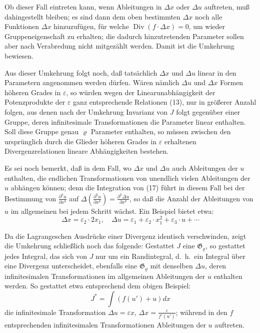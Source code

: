\documentclass[12pt,a4paper]{article}
\begin{document}
Ob dieser Fall eintreten kann, wenn Ableitungen in $\Delta x$ oder $\Delta u$ auftreten, mu\ss{} dahingestellt bleiben; es sind dann dem oben bestimmten $\Delta x$ noch alle Funktionen $\Delta x$ hinzuzuf\"ugen, f\"ur welche $\operatorname{Div}(f\cdot\Delta x)=0$, um wieder Gruppeneigenschaft zu erhalten; die dadurch hinzutretenden Parameter sollen aber nach Verabredung nicht mitgez\"ahlt werden. Damit ist die Umkehrung bewiesen.

Aus dieser Umkehrung folgt noch, da\ss{} tats\"achlich $\Delta x$ und $\Delta u$ linear in den Parametern angenommen werden d\"urfen. W\"aren n\"amlich $\Delta u$ und $\Delta x$ Formen h\"oheren Grades in $\varepsilon$, so w\"urden wegen der Linearunabh\"angigkeit der Potenzprodukte der $\varepsilon$ ganz entsprechende Relationen (13), nur in gr\"o\ss{}erer Anzahl folgen, aus denen nach der Umkehrung Invarianz von $J$ folgt gegen\"uber einer Gruppe, deren infinitesimale Transformationen die Parameter linear enthalten. Soll diese Gruppe genau $\varrho$ Parameter enthalten, so m\"ussen zwischen den urspr\"unglich durch die Glieder h\"oheren Grades in $\varepsilon$ erhaltenen Divergenzrelationen lineare Abh\"angigkeiten bestehen.

Es sei noch bemerkt, da\ss{} in dem Fall, wo $\Delta x$ und $\Delta u$ auch Ableitungen der $u$ enthalten, die endlichen Transformationen von unendlich vielen Ableitungen der $u$ abh\"angen k\"onnen; denn die Integration von (17) f\"uhrt in diesem Fall bei der Bestimmung von $\frac{\partial^{k}u}{\partial x^{k}}$ auf $\Delta\left(\frac{\partial^{k}u}{\partial x^{k}}\right)=\frac{\partial^{k}\Delta u}{\partial x^{k}}$, so da\ss{} die Anzahl der Ableitungen von $u$ im allgemeinen bei jedem Schritt w\"achst. Ein Beispiel bietet etwa:
\[
\Delta x=\varepsilon_{2}\cdot 2x_{1},\quad \Delta u=\varepsilon_{1}+\varepsilon_{2}\cdot x_{1}^{2}+\varepsilon_{3}\cdot u+\cdots
\]

Da die Lagrangeschen Ausdr\"ucke einer Divergenz identisch verschwinden, zeigt die Umkehrung schlie\ss{}lich noch das folgende: Gestattet $J$ eine $\mathfrak{G}_{\varrho}$, so gestattet jedes Integral, das sich von $J$ nur um ein Randintegral, d.\ h.\ ein Integral \"uber eine Divergenz unterscheidet, ebenfalls eine $\mathfrak{G}_{\varrho}$ mit denselben $\Delta u$, deren infinitesimalen Transformationen im allgemeinen Ableitungen der $u$ enthalten werden. So gestattet etwa entsprechend dem obigen Beispiel:
\[
J^{*}=\int\left(f(u')+u\right)dx
\]
die infinitesimale Transformation $\Delta u=\varepsilon x$, $\Delta x=\tfrac{\varepsilon}{f'(u')}$; w\"ahrend in den $f$ entsprechenden infinitesimalen Transformationen Ableitungen der $u$ auftreten.
\end{document}
